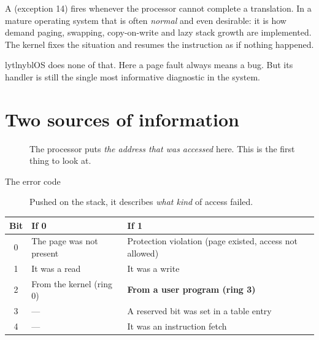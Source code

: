 A  (exception 14) fires whenever the processor cannot complete a translation. In a
mature operating system that is often \emph{normal} and even desirable: it is how demand paging,
swapping, copy-on-write and lazy stack growth are implemented. The kernel fixes the situation and
resumes the instruction as if nothing happened.

lytlnyblOS does none of that. Here a page fault always means a bug. But its handler is still the
single most informative diagnostic in the system.

\section{Two sources of information}

\begin{description}
  \item[] The processor puts \emph{the address that was accessed} here. This is the first
    thing to look at.
  \item[The error code] Pushed on the stack, it describes \emph{what kind} of access failed.
\end{description}

\begin{center}
\begin{tabularx}{\textwidth}{@{}c l X@{}}
\toprule
\textbf{Bit} & \textbf{If 0} & \textbf{If 1} \\
\midrule
0 & The page was not present & Protection violation (page existed, access not allowed) \\
1 & It was a read & It was a write \\
2 & From the kernel (ring 0) & \textbf{From a user program (ring 3)} \\
3 & --- & A reserved bit was set in a table entry \\
4 & --- & It was an instruction fetch \\
\bottomrule
\end{tabularx}
\end{center}

